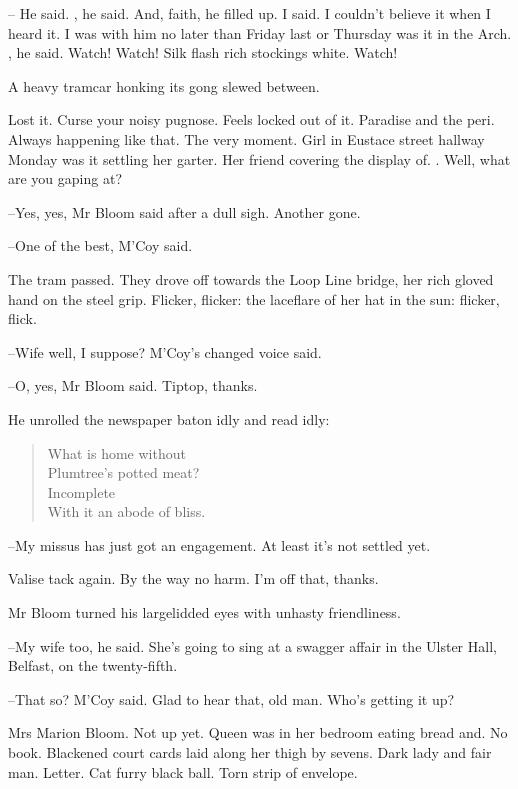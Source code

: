 --
He said.
,
he said.
And, faith, he filled up.
I said.
I couldn't believe it when I heard it.
I was with him no later than Friday last
or Thursday was it
in the Arch.
, he said.
Watch!
Watch!
Silk flash rich stockings white.
Watch!

A heavy tramcar honking its gong
slewed between.

Lost it.
Curse your noisy pugnose.
Feels locked out of it.
Paradise and the peri.
Always happening like that.
The very moment.
Girl in Eustace street hallway
Monday was it
settling her garter.
Her friend covering the display of.
.
Well, what are you gaping at?

--Yes, yes,
Mr Bloom said after a dull sigh.
Another gone.

--One of the best,
M'Coy said.

The tram passed.
They drove off towards the Loop Line bridge,
her rich gloved hand on the steel grip.
Flicker, flicker:
the laceflare of her hat in the sun:
flicker, flick.

--Wife well, I suppose?
M'Coy's changed voice said.

--O, yes,
Mr Bloom said.
Tiptop, thanks.

He unrolled the newspaper baton idly and read idly:


\begin{verse}
    What is home without \\
    Plumtree's potted meat? \\
    Incomplete \\
    With it an abode of bliss.
\end{verse}


--My missus has just got an engagement.
At least it's not settled yet.

Valise tack again.
By the way no harm.
I'm off that, thanks.

Mr Bloom turned his largelidded eyes
with unhasty friendliness.

--My wife too,
he said.
She's going to sing at a swagger affair in the Ulster Hall, Belfast,
on the twenty-fifth.

--That so?
M'Coy said.
Glad to hear that,
old man.
Who's getting it up?

Mrs Marion Bloom.
Not up yet.
Queen was in her bedroom eating bread and.
No book.
Blackened court cards laid along her thigh by sevens.
Dark lady and fair man.
Letter.
Cat furry black ball.
Torn strip of envelope.


